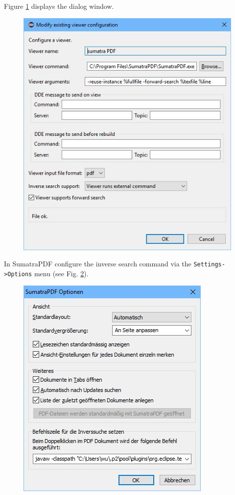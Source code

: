 \begin{otherlanguage}{english}
Figure \ref{fig:viewer_settings} displays the dialog window.
%
\begin{figure}[htb]
	\centering
	\includegraphics[scale=0.40]{images/Viewer_settings.jpg}
	\label{fig:viewer_settings}
\end{figure}

In SumatraPDF configure the inverse search command via the \texttt{Settings->Options} menu (see Fig. \ref{fig:sumatrapdf_options}).
%
\begin{figure}[htb]
	\centering
	\includegraphics[scale=0.40]{images/SumatraPDF_optionen.jpg}
	\label{fig:sumatrapdf_options}
\end{figure}


\end{otherlanguage}
